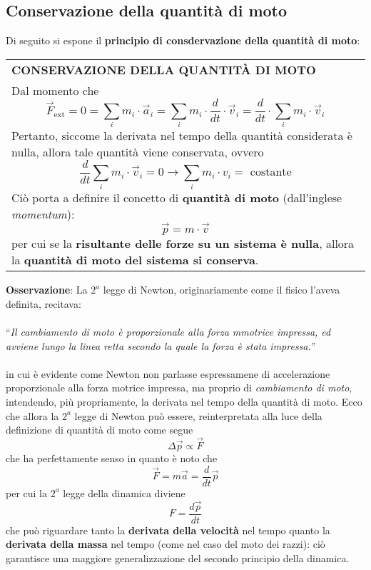 \documentclass[a4paper]{extarticle}
\newcommand{\quotes}[1]{``#1''}
\renewcommand\arraystretch{}
\begin{document}
\vspace{1em}
\subsection{Conservazione della quantità di moto}
Di seguito si espone il \textbf{principio di consdervazione della quantità di moto}:

\vspace{1em}
\setlength{\tabcolsep}{14pt}
\renewcommand{\arraystretch}{2}
\noindent
\begin{tabularx}{\textwidth}{@{}|P|@{}}
    \hline
    {\textbf{CONSERVAZIONE DELLA QUANTITÀ DI MOTO}}\\
    \parbox{\linewidth}{Dal momento che
    \[\vec F_{\text{ext}} = 0 = \sum_i m_i \cdot \vec a_i = \sum_i m_i \cdot \frac{d}{dt} \cdot \vec v_i = \frac{d}{dt} \cdot \sum_i m_i \cdot \vec v_i\]
    Pertanto, siccome la derivata nel tempo della quantità considerata è nulla, allora tale quantità viene conservata, ovvero
    \[\frac{d}{dt} \sum_i m_i \cdot \vec v_i = 0 \longrightarrow \sum_i m_i \cdot v_i = \text{ costante}\]
    Ciò porta a definire il concetto di \textbf{quantità di moto} (dall'inglese \emph{momentum}):
    \[\boxed{\vec p = m \cdot \vec v}\]
    per cui se la \textbf{risultante delle forze su un sistema è nulla}, allora la \textbf{quantità di moto del sistema si conserva}.\vspace{3mm}}\\
    \hline
\end{tabularx}

\newpage
\noindent
\textbf{Osservazione}: La $2^a$ legge di Newton, originariamente come il fisico l'aveva definita, recitava:\\\\
\quotes{\emph{Il cambiamento di moto è proporzionale alla forza mmotrice impressa, ed avviene lungo la linea retta secondo la quale la forza è stata impressa.}}\\\\
in cui è evidente come Newton non parlasse espressamene di accelerazione proporzionale alla forza motrice impressa, ma proprio di \emph{cambiamento di moto}, intendendo, più propriamente, la derivata nel tempo della quantità di moto. Ecco che allora la $2^a$ legge di Newton può essere, reinterpretata alla luce della definizione di quantità di moto come segue
\[\boxed{\Delta \vec p \propto \vec F}\]
che ha perfettamente senso in quanto è noto che
\[\vec F = m \vec a = \frac{d}{dt} \vec p\]
per cui la $2^a$ legge della dinamica diviene
\[\boxed{F=\frac{d\vec p}{dt}}\]
che può riguardare tanto la \textbf{derivata della velocità} nel tempo quanto la \textbf{derivata della massa} nel tempo (come nel caso del moto dei razzi): ciò garantisce una maggiore generalizzazione del secondo principio della dinamica.
\end{document}
